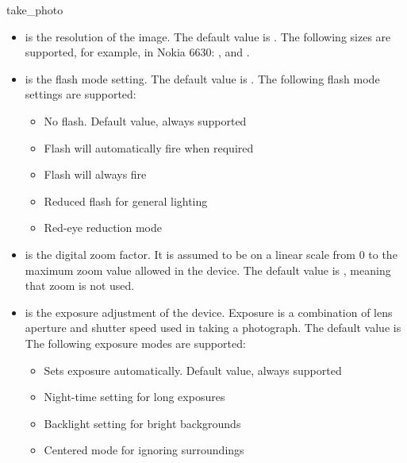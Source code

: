 \begin{funcdesc}{take_photo}{}
\begin{itemize}
Note that there is variety between the devices and the supported formats.

\item {} is the resolution of the image. The default value is . The following sizes are supported, for example, in Nokia 6630: ,  and .
\item {} is the flash mode setting. The default value is . The following flash mode settings are supported:
	\begin{itemize}
	\item {}No flash. Default value, always supported
	\item {}Flash will automatically fire when required
	\item {}Flash will always fire
	\item {}Reduced flash for general lighting
	\item {}Red-eye reduction mode
	\end{itemize}
\item {} is the digital zoom factor. It is assumed to be on a linear scale from 0 to the maximum zoom value allowed in the device. The default value is , meaning that zoom is not used. 
\item {} is the exposure adjustment of the device. Exposure is a combination of lens aperture and shutter speed used in taking a photograph. The default value is  The following exposure modes are supported:
	\begin{itemize}
	\item {} \newline
Sets exposure automatically. Default value, always supported
	\item {} \newline
Night-time setting for long exposures
	\item {} \newline
Backlight setting for bright backgrounds
	\item {} \newline
Centered mode for ignoring surroundings
	\end{itemize}

\end{itemize}
\end{funcdesc}
